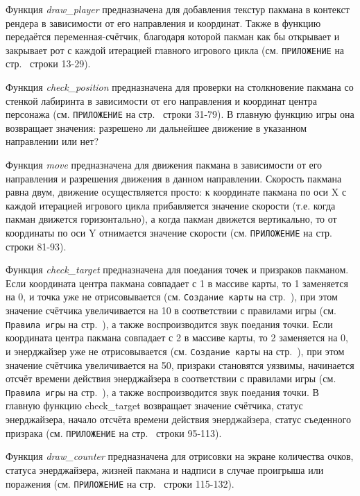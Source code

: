 Функция \textit{draw\_player} предназначена для добавления текстур пакмана в контекст рендера в зависимости от его направления и координат. Также в функцию передаётся переменная-счётчик, благодаря которой пакман как бы открывает и закрывает рот с каждой итерацией главного игрового цикла (см. \texttt{ПРИЛОЖЕНИЕ} на стр.~\pageref{code:player} строки 13-29).

Функция \textit{check\_position} предназначена для проверки на столкновение пакмана со стенкой лабиринта в зависимости от его направления и координат центра персонажа (см. \texttt{ПРИЛОЖЕНИЕ} на стр.~\pageref{code:player} строки 31-79). В главную функцию игры она возвращает значения: разрешено ли дальнейшее движение в указанном направлении или нет?

Функция \textit{move} предназначена для движения пакмана в зависимости от его направления и разрешения движения в данном направлении. Скорость пакмана равна двум, движение осуществляется просто: к координате пакмана по оси X с каждой итерацией игрового цикла прибавляется значение скорости (т.е. когда пакман движется горизонтально), а когда пакман движется вертикально, то от координаты по оси Y отнимается значение скорости (см. \texttt{ПРИЛОЖЕНИЕ} на стр.~\pageref{code:player} строки 81-93).

Функция \textit{check\_target} предназначена для поедания точек и призраков пакманом. Если координата центра пакмана совпадает с 1 в массиве карты, то 1 заменяется на 0, и точка уже не отрисовывается (см. \texttt{Создание карты} на стр.~\pageref{subsec:ch02/sec01/sub04}), при этом значение счётчика увеличивается на 10 в соответствии с правилами игры (см. \texttt{Правила игры} на стр.~\pageref{subsec:ch01/sec04/subsec02}), а также воспроизводится звук поедания точки. Если координата центра пакмана совпадает с 2 в массиве карты, то 2 заменяется на 0, и энерджайзер уже не отрисовывается (см. \texttt{Создание карты} на стр.~\pageref{subsec:ch02/sec01/sub04}), при этом значение счётчика увеличивается на 50, призраки становятся уязвимы, начинается отсчёт времени действия энерджайзера в соответствии с правилами игры (см. \texttt{Правила игры} на стр.~\pageref{subsec:ch01/sec04/subsec02}), а также воспроизводится звук поедания точки. В главную функцию check\_target возвращает значение счётчика, статус энерджайзера, начало отсчёта времени действия энерджайзера, статус съеденного призрака (см. \texttt{ПРИЛОЖЕНИЕ} на стр.~\pageref{code:player} строки 95-113).

Функция \textit{draw\_counter} предназначена для отрисовки на экране количества очков, статуса энерджайзера, жизней пакмана и надписи в случае проигрыша или поражения (см. \texttt{ПРИЛОЖЕНИЕ} на стр.~\pageref{code:player} строки 115-132).

